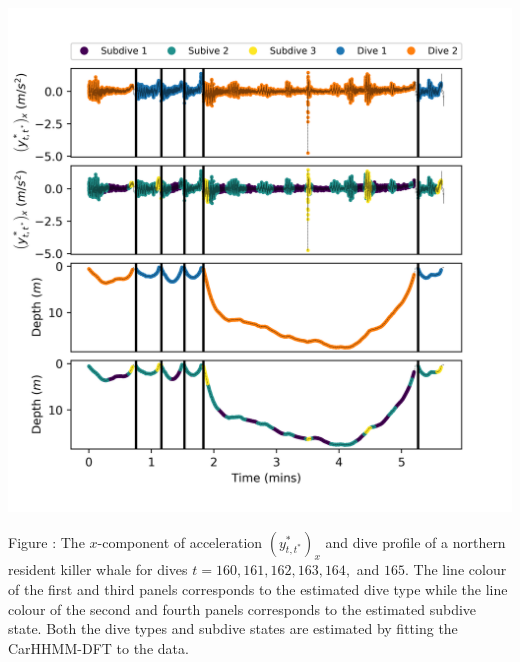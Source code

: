 \documentclass{article}
\begin{document}
        \begin{center}
        \includegraphics[width=6in]{../Plots/CarHHMM2_decoded_dives.png}
        \end{center}
        
        \noindent Figure : The $x$-component of acceleration $\left(y^*_{t,t^*}\right)_x$ and dive profile of a northern resident killer whale for dives $t = 160,161,162,163,164,$ and $165$. The line colour of the first and third panels corresponds to the estimated dive type while the line colour of the second and fourth panels corresponds to the estimated subdive state. Both the dive types and subdive states are estimated by fitting the CarHHMM-DFT to the data.
        \addtocounter{fignum}{1}
        
\end{document}
